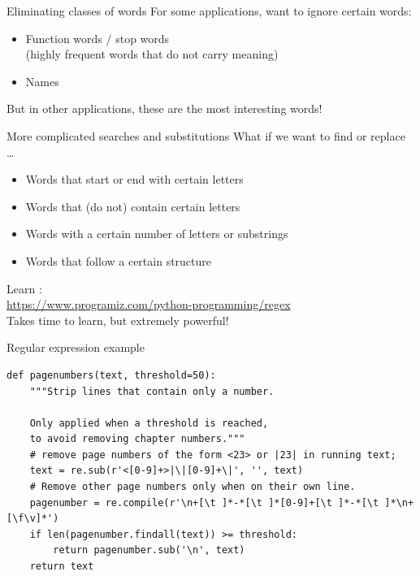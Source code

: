 \documentclass[aspectratio=169,usenames,dvipsnames]{beamer}
\begin{document}
\begin{frame}{Eliminating classes of words}
    For some applications, want to ignore certain words:
    \begin{itemize}
        \item Function words / stop words \\
            (highly frequent words that do not carry meaning)
        \item Names
    \end{itemize}

    But in other applications, these are the most interesting words!
\end{frame}

\begin{frame}{More complicated searches and substitutions}
What if we want to find or replace \dots
\begin{itemize}
    \item Words that start or end with certain letters
    \item Words that (do not) contain certain letters
    \item Words with a certain number of letters or substrings
    \item Words that follow a certain structure
\end{itemize}

Learn :\\
\url{https://www.programiz.com/python-programming/regex} \\

\vspace{1em}
Takes time to learn, but extremely powerful!
\end{frame}

\begin{frame}[fragile]{Regular expression example}
\begin{lstlisting}
def pagenumbers(text, threshold=50):
    """Strip lines that contain only a number.

    Only applied when a threshold is reached,
    to avoid removing chapter numbers."""
    # remove page numbers of the form <23> or |23| in running text;
    text = re.sub(r'<[0-9]+>|\|[0-9]+\|', '', text)
    # Remove other page numbers only when on their own line.
    pagenumber = re.compile(r'\n+[\t ]*-*[\t ]*[0-9]+[\t ]*-*[\t ]*\n+[\f\v]*')
    if len(pagenumber.findall(text)) >= threshold:
        return pagenumber.sub('\n', text)
    return text
\end{lstlisting}
\end{frame}
\end{document}
